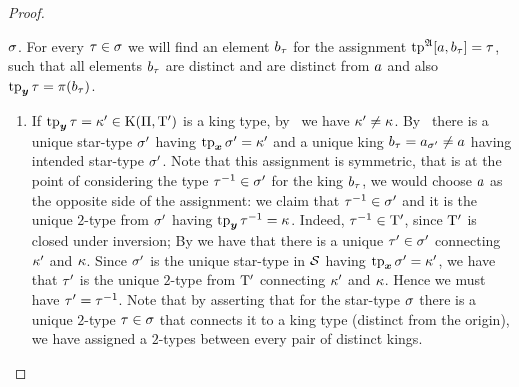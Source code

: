 \begin{proof}
\begin{description}
  $\sigma$.
  For every $\tau \in \sigma$ we will find an element $b_{\tau}$ for the
  assignment $\operatorname{tp}^{\mathfrak{A}}[a,b_{\tau}] = \tau$, such that all elements
  $b_{\tau}$ are distinct and are distinct from $a$ and also $\operatorname{tp}_{\bm{y}}\tau =
  \pi(b_{\tau})$.
  \begin{enumerate}
  \item If $\operatorname{tp}_{\bm{y}}\tau = {\kappa'} \in \mathrm{K}(\Pi,{\mathrm{T}'})$ is a king type,
  by~ we have ${\kappa'} \neq \kappa$. By~
  there is a unique star-type ${\sigma'}$ having $\operatorname{tp}_{\bm{x}}{\sigma'} = {\kappa'}$ and a unique
  king $b_{\tau} = a_{{\sigma'}} \neq a$ having intended star-type ${\sigma'}$.
  Note that this assignment is symmetric, that is at the point of considering
  the type $\tau^{-1} \in {\sigma'}$ for the king $b_{\tau}$, we would choose $a$ as
  the opposite side of the assignment: we claim that $\tau^{-1} \in
  {\sigma'}$ and it is the unique $2$-type from ${\sigma'}$ having $\operatorname{tp}_{\bm{y}}\tau^{-1}
  = \kappa$.
  Indeed, $\tau^{-1} \in {\mathrm{T}'}$, since ${\mathrm{T}'}$ is closed under inversion;
  By  we have that there is a unique ${\tau'} \in {\sigma'}$ connecting
  ${\kappa'}$ and $\kappa$. Since ${\sigma'}$ is the unique star-type in $\mathcal{S}$
  having $\operatorname{tp}_{\bm{x}}{\sigma'} = {\kappa'}$, we have that ${\tau'}$ is the unique $2$-type
  from ${\mathrm{T}'}$ connecting ${\kappa'}$ and $\kappa$. Hence we must have ${\tau'} =
  \tau^{-1}$.
  Note that by  asserting that for the star-type $\sigma$ there is a
  unique $2$-type $\tau \in \sigma$ that connects it to a king type (distinct
  from the origin), we have assigned a $2$-types between every pair of distinct
  kings.
  

\end{enumerate}
\end{description}
\end{proof}
